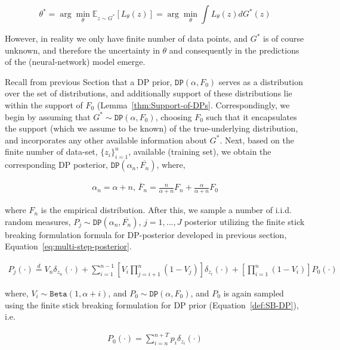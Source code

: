 \documentclass[10pt]{article}
\begin{document}
\begin{equation}\label{Eq:convoluted-loss}
\theta^{*}= \arg \min_{\theta} \mathbb{E}_{z\sim G^{*}}[L_{\theta}(z)] = \arg \min_{\theta}\int L_{\theta}(z) dG^{*}(z) 
\end{equation}


However, in reality we only have finite number of data points, and $G^{*}$ is of course unknown, and  therefore the uncertainty in $\theta$ and consequently in the predictions of the (neural-network) model emerge. 

Recall from previous Section that a DP prior, $\texttt{DP}(\alpha, F_{0})$ serves as a distribution over the set of distributions, and additionally support of these distributions lie within the support of $F_{0}$ (Lemma~\ref{thm:Support-of-DPs}.  Correspondingly, we begin by assuming that $G^{*} \sim \texttt{DP}(\alpha, F_{0})$, choosing $F_{0}$  such that it encapsulates the support (which we assume to be known) of the true-underlying distribution, and incorporates any other available information about $G^{*}$.  Next, based on the finite number of data-set, $\{z_{i}\}_{i=1}^{n}$, available (training set), we obtain the corresponding DP posterior, $\texttt{DP}(\alpha_{n}, \overline{F_{n}})$, where, 

\begin{align}
\alpha_{n} = \alpha + n, \, \overline{F}_n = \frac{n}{\alpha+n}{F}_n + \frac{\alpha}{\alpha+n}F_0 
\end{align}

where $F_{n}$ is the empirical distribution. After this, we sample a number of i.i.d. random measures, $P_{j} \sim \texttt{DP}(\alpha_{n}, \overline{F_{n}})$, $j=1, ... , J$ posterior utilizing the finite stick breaking formulation formula for DP-posterior developed in previous section, Equation~\ref{eq:multi-step-posterior}. 


\begin{align}
\label{eq:multi-step-posterior-Ch4}
P_{j}(\cdot) \stackrel{d}{=} V_{n}\delta_{z_{n}}(\cdot) + \sum_{i=1}^{n-1}\left[V_{i}\prod_{j=i+1}^{n}(1-V_{j})\right]\delta_{z_{i}}(\cdot) + \left[\prod_{i=1}^{n}(1-V_{i})\right] P_{0}(\cdot)
\end{align}

where, $V_{i} \sim \texttt{Beta}(1,\alpha + i)$, and $P_{0}\sim \texttt{DP}(\alpha, F_{0})$, and $P_{0}$ is again sampled using the finite stick breaking formulation for DP prior (Equation~\ref{def:SB-DP}), i.e.


\begin{align}\label{def:Stick-Breaking-priors-Ch4}
{P_{0}}(\cdot) = \sum_{i=n}^{n+T}p_{i}\delta_{z_{i}}(\cdot)
\end{align}
\end{document}
